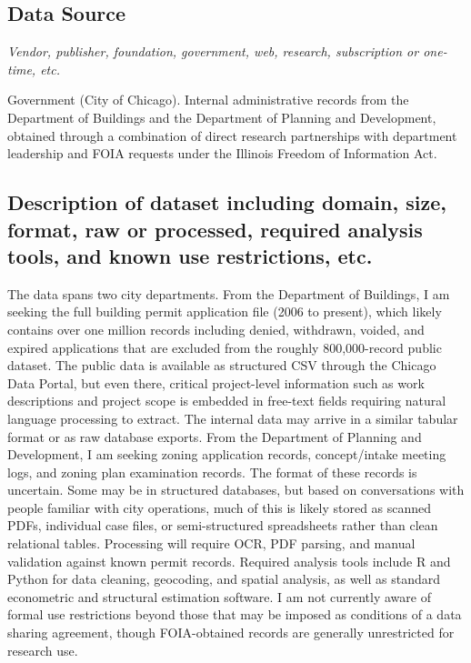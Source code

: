 \documentclass[12pt]{article}
\begin{document}
\subsection*{Data Source}

\textit{Vendor, publisher, foundation, government, web, research, subscription or one-time, etc.}

\medskip

Government (City of Chicago). Internal administrative records from the Department of Buildings and the Department of Planning and Development, obtained through a combination of direct research partnerships with department leadership and FOIA requests under the Illinois Freedom of Information Act.

\subsection*{Description of dataset including domain, size, format, raw or processed, required analysis tools, and known use restrictions, etc.}

The data spans two city departments. From the Department of Buildings, I am seeking the full building permit application file (2006 to present), which likely contains over one million records including denied, withdrawn, voided, and expired applications that are excluded from the roughly 800,000-record public dataset. The public data is available as structured CSV through the Chicago Data Portal, but even there, critical project-level information such as work descriptions and project scope is embedded in free-text fields requiring natural language processing to extract. The internal data may arrive in a similar tabular format or as raw database exports. From the Department of Planning and Development, I am seeking zoning application records, concept/intake meeting logs, and zoning plan examination records. The format of these records is uncertain. Some may be in structured databases, but based on conversations with people familiar with city operations, much of this is likely stored as scanned PDFs, individual case files, or semi-structured spreadsheets rather than clean relational tables. Processing will require OCR, PDF parsing, and manual validation against known permit records. Required analysis tools include R and Python for data cleaning, geocoding, and spatial analysis, as well as standard econometric and structural estimation software. I am not currently aware of formal use restrictions beyond those that may be imposed as conditions of a data sharing agreement, though FOIA-obtained records are generally unrestricted for research use.
\end{document}

